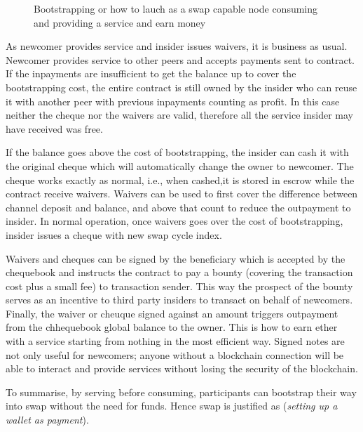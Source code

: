 \begin{center}
\begin{figure}
\begin{center}
\end{center}
\caption{Bootstrapping or how to lauch as a swap capable node consuming and providing a
service  and earn money}
\label{fig:bootstrapping}
\end{figure}
\end{center}


As newcomer provides service and insider issues waivers, it is business as usual.
Newcomer provides service to other peers and accepts payments sent to
contract. If the inpayments are insufficient to get the balance up
to cover the bootstrapping cost, the entire contract is still owned by the insider
who can reuse it with another peer with previous inpayments counting as profit.
In this case neither the cheque nor the waivers are valid, therefore all the service insider
may have received was free.

If the balance goes above the cost of bootstrapping, the insider can cash it with
the original cheque which will automatically change the owner to newcomer.
The cheque works exactly as normal, i.e., when cashed,it is stored in escrow
while the contract receive waivers.
Waivers can be used to first cover the difference between channel deposit and balance, and above that
count to reduce the outpayment to insider. In normal operation, once waivers goes over
the cost of bootstrapping, insider issues a cheque with new swap cycle index.


Waivers and cheques can be signed by the beneficiary which is accepted by the chequebook
and instructs the contract to pay a bounty (covering the transaction cost plus a small
fee) to transaction sender. This way the prospect of the bounty serves as an incentive to
third party insiders to transact on behalf of newcomers.
Finally, the waiver or cheuque signed against
an amount triggers outpayment from the chhequebook global  balance to the owner.
This is how to earn ether with a service starting from nothing in the most efficient way.
Signed notes are not only useful for newcomers; anyone without a blockchain connection
will be able to interact and provide services without losing the security of the blockchain.

To summarise, by serving before consuming, participants can
bootstrap their way into swap without the need for funds.
Hence swap is justified as (\emph{setting up a wallet as payment}).
